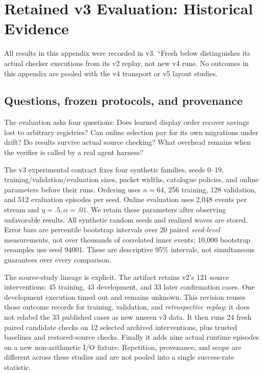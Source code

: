 \section{Retained v3 Evaluation: Historical Evidence}\label{app:v3evidence}
All results in this appendix were recorded in v3. ``Fresh below distinguishes its actual checker executions from its v2 replay, not new v4 runs. No outcomes in this appendix are pooled with the v4 transport or v5 layout studies.
\subsection{Questions, frozen protocols, and provenance}
The evaluation asks four questions: Does learned display order recover savings lost to arbitrary registries? Can online selection pay for its own migrations under drift? Do results survive actual source checking? What overhead remains when the verifier is called by a real agent harness?

The v3 experimental contract fixes four synthetic families, seeds 0--19, training/validation/evaluation sizes, packet widths, catalogue policies, and online parameters before their runs. Ordering uses $n=64$, 256 training, 128 validation, and 512 evaluation episodes per seed. Online evaluation uses 2,048 events per stream and $\eta=.5,\alpha=.01$. We retain these parameters after observing unfavorable results. All synthetic random seeds and realized waves are stored. Error bars are percentile bootstrap intervals over 20 paired \emph{seed-level} measurements, not over thousands of correlated inner events; 10,000 bootstrap resamples use seed 94001. These are descriptive 95\% intervals, not simultaneous guarantees over every comparison.

The source-study lineage is explicit. The artifact retains v2's 121 source interventions: 45 training, 43 development, and 33 later confirmation cases. One development execution timed out and remains unknown. This revision reuses those outcome records for training, validation, and \emph{retrospective replay}; it does not relabel the 33 published cases as new unseen v3 data. It then runs 24 fresh paired candidate checks on 12 selected archived interventions, plus trusted baselines and restored-source checks. Finally it adds nine actual runtime episodes on a new non-arithmetic I/O fixture. Repetition, provenance, and scope are different across these studies and are not pooled into a single success-rate statistic.

